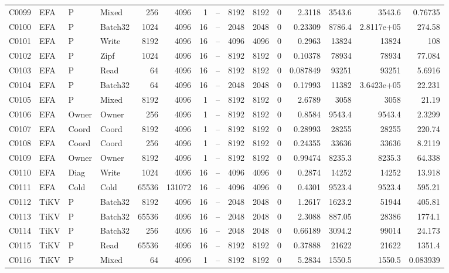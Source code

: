 \begin{landscape}
\begin{longtable}{llllrrrrrrrrrrr}
C0099 & EFA & P & Mixed & 256 & 4096 & 1 & -- & 8192 & 8192 & 0 & 2.3118 & 3543.6 & 3543.6 & 0.76735\\
C0100 & EFA & P & Batch32 & 1024 & 4096 & 16 & -- & 2048 & 2048 & 0 & 0.23309 & 8786.4 & 2.8117e+05 & 274.58\\
C0101 & EFA & P & Write & 8192 & 4096 & 16 & -- & 4096 & 4096 & 0 & 0.2963 & 13824 & 13824 & 108\\
C0102 & EFA & P & Zipf & 1024 & 4096 & 16 & -- & 8192 & 8192 & 0 & 0.10378 & 78934 & 78934 & 77.084\\
C0103 & EFA & P & Read & 64 & 4096 & 16 & -- & 8192 & 8192 & 0 & 0.087849 & 93251 & 93251 & 5.6916\\
C0104 & EFA & P & Batch32 & 64 & 4096 & 16 & -- & 2048 & 2048 & 0 & 0.17993 & 11382 & 3.6423e+05 & 22.231\\
C0105 & EFA & P & Mixed & 8192 & 4096 & 1 & -- & 8192 & 8192 & 0 & 2.6789 & 3058 & 3058 & 21.19\\
C0106 & EFA & Owner & Owner & 256 & 4096 & 1 & -- & 8192 & 8192 & 0 & 0.8584 & 9543.4 & 9543.4 & 2.3299\\
C0107 & EFA & Coord & Coord & 8192 & 4096 & 1 & -- & 8192 & 8192 & 0 & 0.28993 & 28255 & 28255 & 220.74\\
C0108 & EFA & Coord & Coord & 256 & 4096 & 1 & -- & 8192 & 8192 & 0 & 0.24355 & 33636 & 33636 & 8.2119\\
C0109 & EFA & Owner & Owner & 8192 & 4096 & 1 & -- & 8192 & 8192 & 0 & 0.99474 & 8235.3 & 8235.3 & 64.338\\
C0110 & EFA & Diag & Write & 1024 & 4096 & 16 & -- & 4096 & 4096 & 0 & 0.2874 & 14252 & 14252 & 13.918\\
C0111 & EFA & Cold & Cold & 65536 & 131072 & 16 & -- & 4096 & 4096 & 0 & 0.4301 & 9523.4 & 9523.4 & 595.21\\
C0112 & TiKV & P & Batch32 & 8192 & 4096 & 16 & -- & 2048 & 2048 & 0 & 1.2617 & 1623.2 & 51944 & 405.81\\
C0113 & TiKV & P & Batch32 & 65536 & 4096 & 16 & -- & 2048 & 2048 & 0 & 2.3088 & 887.05 & 28386 & 1774.1\\
C0114 & TiKV & P & Batch32 & 256 & 4096 & 16 & -- & 2048 & 2048 & 0 & 0.66189 & 3094.2 & 99014 & 24.173\\
C0115 & TiKV & P & Read & 65536 & 4096 & 16 & -- & 8192 & 8192 & 0 & 0.37888 & 21622 & 21622 & 1351.4\\
C0116 & TiKV & P & Mixed & 64 & 4096 & 1 & -- & 8192 & 8192 & 0 & 5.2834 & 1550.5 & 1550.5 & 0.083939\\

\end{longtable}
\end{landscape}
